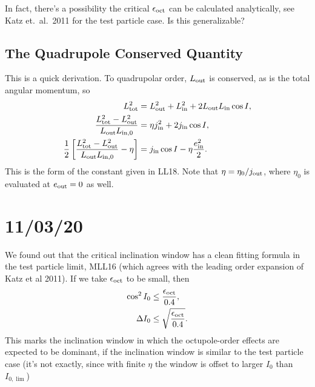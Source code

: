 \documentclass[11pt,
        usenames, %
        dvipsnames %
    ]{article}
\newcommand*{\s}[1]{\left[#1\right]}
\begin{document}
In fact, there's a possibility the critical $\epsilon_{\rm oct}$ can be
calculated analytically, see Katz et.\ al.\ 2011 for the test particle case. Is
this generalizable?

\subsection{The Quadrupole Conserved Quantity}

This is a quick derivation. To quadrupolar order, $L_{\rm out}$ is conserved, as
is the total angular momentum, so
\begin{align}
    L_{\rm tot}^2 &= L_{\rm out}^2 + L_{\rm in}^2 + 2L_{\rm out}L_{\rm in}
            \cos I,\\
    \frac{L_{\rm tot}^2 - L_{\rm out}^2}{L_{\rm out}L_{\rm in, 0}} &=
        \eta j_{\rm in}^2 + 2j_{\rm in}\cos I,\\
    \frac{1}{2}\s{\frac{L_{\rm tot}^2 - L_{\rm out}^2}{L_{\rm out}L_{\rm in, 0}}
        - \eta} &= j_{\rm in}\cos I - \eta \frac{e_{\rm in}^2}{2}.
\end{align}
This is the form of the constant given in LL18. Note that $\eta = \eta_0 /
j_{\rm out}$, where $\eta_0$ is evaluated at $e_{\rm out} = 0$ as well.

\section{11/03/20}

We found out that the critical inclination window has a clean fitting formula in
the test particle limit, MLL16 (which agrees with the leading order expansion of
Katz et al 2011). If we take $\epsilon_{\rm oct}$ to be small, then
\begin{align}
    \cos^2 I_0 &\leq \frac{\epsilon_{\rm oct}}{0.4},\\
    \Delta I_0 &\leq \sqrt{\frac{\epsilon_{\rm oct}}{0.4}}.
\end{align}
This marks the inclination window in which the octupole-order effects are
expected to be dominant, if the inclination window is similar to the test
particle case (it's not exactly, since with finite $\eta$ the window is offset
to larger $I_0$ than $I_{0, \lim}$)
\end{document}
